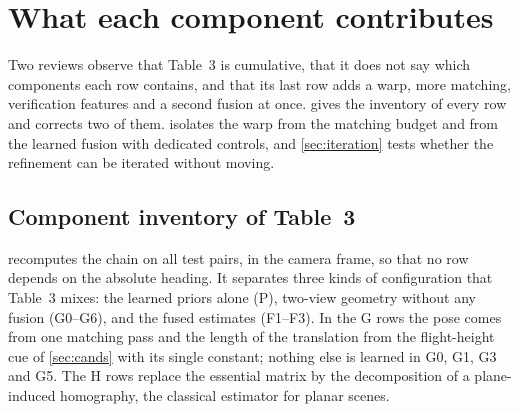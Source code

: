 \section{What each component contributes}
\label{sec:ablation}

Two reviews observe that Table~3 is cumulative, that it does not say which components each row contains, and that its last row adds a warp, more matching, verification features and a second fusion at once.  gives the inventory of every row and corrects two of them.  isolates the warp from the matching budget and from the learned fusion with dedicated controls, and \cref{sec:iteration} tests whether the refinement can be iterated without moving.

\subsection{Component inventory of Table~3}
\label{sec:inventory}



 recomputes the chain on all \nTest{} test pairs, in the camera frame, so that no row depends on the absolute heading. It separates three kinds of configuration that Table~3 mixes: the learned priors alone (P), two-view geometry without any fusion (G0--G6), and the fused estimates (F1--F3). In the G rows the pose comes from one matching pass and the length of the translation from the flight-height cue of \cref{sec:cands} with its single constant; nothing else is learned in G0, G1, G3 and G5. The H rows replace the essential matrix by the decomposition of a plane-induced homography, the classical estimator for planar scenes.

